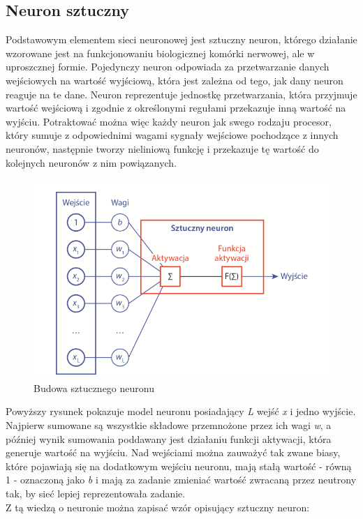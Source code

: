 \documentclass[a4paper, 12pt]{article}
\begin{document}
\subsection{Neuron sztuczny}
Podstawowym elementem sieci neuronowej jest sztuczny neuron, którego działanie wzorowane jest na funkcjonowaniu biologicznej komórki nerwowej, ale w uproszcznej formie. Pojedynczy neuron odpowiada za przetwarzanie danych wejściowych na wartość wyjściową, która jest zależna od tego, jak dany neuron reaguje na te dane. Neuron reprezentuje jednostkę przetwarzania, która przyjmuje wartość wejściową i zgodnie z określonymi regułami przekazuje inną wartość na wyjściu. Potraktować można więc każdy neuron jak  swego rodzaju procesor, który sumuje z odpowiednimi wagami sygnały wejściowe pochodzące z innych neuronów, następnie tworzy nieliniową funkcję i przekazuje tę wartość do kolejnych neuronów z nim powiązanych.

\begin{figure}[hbt!]
\includegraphics[width=12cm]{Neuron}
\centering
\caption{Budowa sztucznego neuronu\cite {book7}}
\end{figure}
Powyższy rysunek pokazuje model neuronu posiadający \textit{L} wejść \textit{x} i jedno wyjście. Najpierw sumowane są wszystkie składowe przemnożone przez ich wagi \textit{w}, a później wynik sumowania poddawany jest działaniu funkcji aktywacji, która generuje wartość na wyjściu. Nad wejściami można zauważyć tak zwane biasy, które pojawiają się na dodatkowym wejściu neuronu, mają stałą wartość - równą 1 - oznaczoną jako \textit{b} i mają za zadanie zmieniać wartość zwracaną przez neutrony tak, by sieć lepiej reprezentowała zadanie.\\
Z tą wiedzą o neuronie można zapisać wzór opisujący sztuczny neuron:
\end{document}

